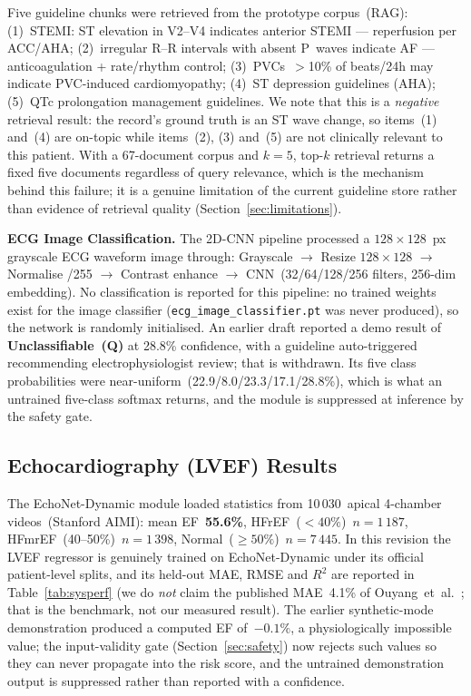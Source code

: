 \documentclass[AMA,STIX1COL,]{WileyNJD-v2}
\begin{document}
Five guideline chunks were retrieved from the prototype corpus~(RAG):
(1)~STEMI: ST elevation in V2--V4 indicates anterior STEMI --- reperfusion per ACC/AHA;
(2)~irregular R--R intervals with absent P~waves indicate AF --- anticoagulation + rate/rhythm control;
(3)~PVCs~$>$10\% of beats/24h may indicate PVC-induced cardiomyopathy;
(4)~ST depression guidelines (AHA);
(5)~QTc prolongation management guidelines.
We note that this is a \emph{negative} retrieval result: the record's
ground truth is an ST wave change, so items~(1) and~(4) are on-topic
while items~(2), (3) and~(5) are not clinically relevant to this
patient. With a 67-document corpus and $k=5$, top-$k$ retrieval
returns a fixed five documents regardless of query relevance, which
is the mechanism behind this failure; it is a genuine limitation of
the current guideline store rather than evidence of retrieval quality
(Section~\ref{sec:limitations}).

\noindent\textbf{ECG Image Classification.}
The 2D-CNN pipeline processed a $128\times128$~px grayscale ECG
waveform image through: Grayscale $\rightarrow$ Resize $128\times128$
$\rightarrow$ Normalise /255 $\rightarrow$ Contrast enhance
$\rightarrow$ CNN~(32/64/128/256 filters, 256-dim embedding).
No classification is reported for this pipeline: no trained
weights exist for the image classifier (\texttt{ecg\_image\_classifier.pt}
was never produced), so the network is randomly initialised. An earlier
draft reported a demo result of \textbf{Unclassifiable~(Q)} at 28.8\%
confidence, with a guideline auto-triggered recommending
electrophysiologist review; that is withdrawn. Its five class
probabilities were near-uniform~(22.9/8.0/23.3/17.1/28.8\%), which is
what an untrained five-class softmax returns, and the module is
suppressed at inference by the safety gate.

\subsection{Echocardiography (LVEF) Results}

The EchoNet-Dynamic module loaded statistics from 10\,030~apical
4-chamber videos~(Stanford AIMI): mean EF~\textbf{55.6\%},
HFrEF~($<40\%$)~$n=1\,187$, HFmrEF~(40--50\%)~$n=1\,398$,
Normal~($\geq50\%$)~$n=7\,445$. In this revision the LVEF regressor is
genuinely trained on EchoNet-Dynamic under its official
patient-level splits, and its held-out MAE, RMSE and $R^2$ are reported
in Table~\ref{tab:sysperf} (we do \emph{not} claim the published
MAE~4.1\% of Ouyang~et~al.~\cite{ouyang2020}; that is the benchmark, not
our measured result). The earlier synthetic-mode demonstration produced
a computed EF of~$-0.1\%$, a physiologically impossible value; the
input-validity gate (Section~\ref{sec:safety}) now rejects such values
so they can never propagate into the risk score, and the untrained
demonstration output is suppressed rather than reported with a
confidence.
\end{document}
